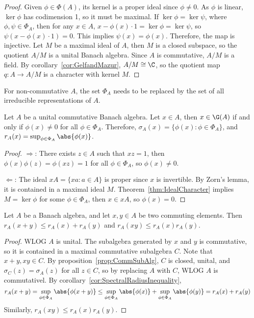 \documentclass[a4paper]{article}
\begin{document}
\begin{proof}
  Given $\phi\in\Phi(A)$, its kernel is a proper ideal since $\phi\not= 0$. As $\phi$ is linear, $\ker\phi$ has codimension 1, so it must be maximal. If $\ker\phi=\ker\psi$, where $\phi,\psi\in\Phi_A$, then for any $x\in A$, $x-\phi(x)\cdot 1=\ker\phi=\ker\psi$, so $\psi(x-\phi(x)\cdot 1)=0$. This implies $\psi(x)=\phi(x)$. Therefore, the map is injective. Let $M$ be a maximal ideal of $A$, then $M$ is a closed subspace, so the quotient $A/M$ is a unital Banach algebra. Since $A$ is commutative, $A/M$ is a field. By corollary~\ref{cor:GelfandMazur}, $A/M\cong\C$, so the quotient map $q:A\to A/M$ is a character with kernel $M$.
\end{proof}

\begin{remark}
  For non-commutative $A$, the set $\Phi_A$ needs to be replaced by the set of all irreducible representations of $A$.
\end{remark}

\begin{ncor}\label{cor:SpectrumCharacter}
  Let $A$ be a unital commutative Banach algebra. Let $x\in A$, then $x\in\G(A)$ if and only if $\phi(x)\not= 0$ for all $\phi\in\Phi_A$. Therefore, $\sigma_A(x)=\{\phi(x):\phi\in\Phi_A\}$, and $r_A(x)=\sup_{\phi\in\Phi_A}\abs{\phi(x)}$.
\end{ncor}

\begin{proof}
  $\Longrightarrow$: There exists $z\in A$ such that $xz=1$, then $\phi(x)\phi(z)=\phi(xz)=1$ for all $\phi\in\Phi_A$, so $\phi(x)\not= 0$.

  $\Longleftarrow$: The ideal $xA=\{xa:a\in A\}$ is proper since $x$ is invertible. By Zorn's lemma, it is contained in a maximal ideal $M$. Theorem~\ref{thm:IdealCharacter} implies $M=\ker\phi$ for some $\phi\in\Phi_A$, then $x\in xA$, so $\phi(x)=0$.
\end{proof}

\begin{ncor}\label{cor:SpectralRadiusInequality}
  Let $A$ be a Banach algebra, and let $x,y\in A$ be two commuting elements. Then $r_A(x+y)\leq r_A(x)+r_A(y)$ and $r_A(xy)\leq r_A(x)r_A(y)$.
\end{ncor}

\begin{proof}
  WLOG $A$ is unital. The subalgebra generated by $x$ and $y$ is commutative, so it is contained in a maximal commutative subalgebra $C$. Note that $x+y,xy\in C$. By proposition~\ref{prop:CommSubAlg}, $C$ is closed, unital, and $\sigma_C(z)=\sigma_A(z)$ for all $z\in C$, so by replacing $A$ with $C$, WLOG $A$ is commutativel. By corollary~\ref{cor:SpectralRadiusInequality},
  \[
    r_A(x+y)=\sup_{\phi\in\Phi_A}\abs{\phi(x+y)}\leq\sup_{\phi\in\Phi_A} \abs{\phi(x)}+\sup_{\phi\in\Phi_A}\abs{\phi(y)}=r_A(x)+r_A(y)
  \]
  Similarly, $r_A(xy)\leq r_A(x)r_A(y)$.
\end{proof}
\end{document}
